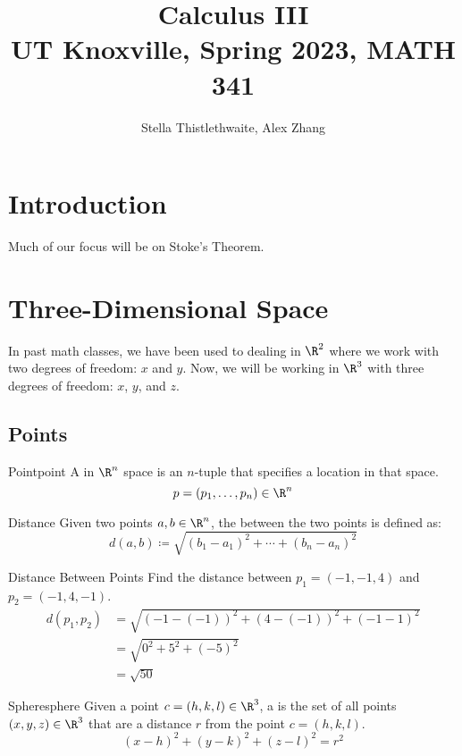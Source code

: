 \documentclass[12pt]{report}
\title{\textbf{Calculus III}\\
\large UT Knoxville, Spring 2023, MATH 341}
\author{Stella Thistlethwaite, Alex Zhang}
\begin{document}
\maketitle
\tableofcontents

\chapter{Introduction}
Much of our focus will be on Stoke's Theorem.

\chapter{Three-Dimensional Space}
In past math classes, we have been used to dealing in $\R^2$ where we work with two degrees of freedom: $x$ and $y$. Now, we will be working in $\R^3$ with three degrees of freedom: $x$, $y$, and $z$.

\section{Points}

\begin{dfnbox}{Point}{point}
    A  in $\R^n$ space is an $n$-tuple that specifies a location in that space.
    \tcblower
    \[ p = (p_1, \ldots, p_n) \in \R^n \]
\end{dfnbox}

\begin{dfnbox}{Distance}{}
    Given two points $a, b\in \R^n$, the  between the two points is defined as:
    \[ d(a, b) \coloneq \sqrt{ (b_1 - a_1)^2 + \cdots + (b_n - a_n)^2} \]
\end{dfnbox}

\begin{exbox}{Distance Between Points}{}
    Find the distance between $p_1 = (-1, -1, 4)$ and $p_2 = (-1, 4, -1)$.
    \tcblower
    \begin{align*}
         d(p_1, p_2) &= \sqrt{ (-1-(-1))^2 + (4-(-1))^2 + (-1-1)^2 } \\
         &= \sqrt{ 0^2 + 5^2 + (-5)^2 } \\
         &= \sqrt{ 50 }
    \end{align*}
\end{exbox}

\begin{dfnbox}{Sphere}{sphere}
    Given a point $c = (h, k, l) \in \R^3$, a  is the set of all points $(x,y,z) \in \R^3$ that are a distance $r$ from the point $c = (h,k,l)$.
    \tcblower
    \[ (x-h)^2 + (y-k)^2 + (z-l)^2 = r^2 \]
\end{dfnbox}
\end{document}
